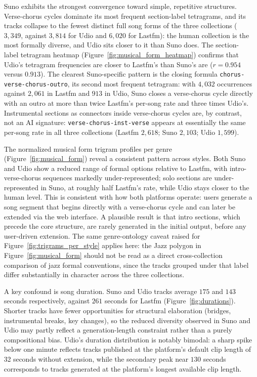 \documentclass{article}
\begin{document}
Suno exhibits the strongest convergence toward simple, repetitive structures. Verse-chorus cycles dominate its most frequent section-label tetragrams, and its tracks collapse to the fewest distinct full song forms of the three collections ($3{,}349$, against $3{,}814$ for Udio and $6{,}020$ for Lastfm): the human collection is the most formally diverse, and Udio sits closer to it than Suno does. The section-label tetragram heatmap (Figure~\ref{fig:musical_form_heatmap}) confirms that Udio's tetragram frequencies are closer to Lastfm's than Suno's are ($r = 0.954$ versus $0.913$). The clearest Suno-specific pattern is the closing formula \texttt{chorus-verse-chorus-outro}, its second most frequent tetragram: with $4,032$ occurrences against $2,061$ in Lastfm and $913$ in Udio, Suno closes a verse-chorus cycle directly with an outro at more than twice Lastfm's per-song rate and three times Udio's. Instrumental sections as connectors inside verse-chorus cycles are, by contrast, not an AI signature: \texttt{verse-chorus-inst-verse} appears at essentially the same per-song rate in all three collections (Lastfm $2,618$; Suno $2,103$; Udio $1,599$). 

The normalized musical form trigram profiles per genre (Figure~\ref{fig:musical_form}) reveal a consistent pattern across styles. Both Suno and Udio show a reduced range of formal options relative to Lastfm, with intro-verse-chorus sequences markedly under-represented; solo sections are under-represented in Suno, at roughly half Lastfm's rate, while Udio stays closer to the human level. This is consistent with how both platforms operate: users generate a song segment that begins directly with a verse-chorus cycle and can later be extended via the web interface. A plausible result is that intro sections, which precede the core structure, are rarely generated in the initial output, before any user-driven extension. The same genre-ontology caveat raised for Figure~\ref{fig:trigrams_per_style} applies here: the Jazz polygon in Figure~\ref{fig:musical_form} should not be read as a direct cross-collection comparison of jazz formal conventions, since the tracks grouped under that label differ substantially in character across the three collections.

A key confound is song duration.
Suno  and Udio tracks average $175$ and $143$ seconds respectively, against $261$ seconds for Lastfm (Figure~\ref{fig:durations}). 
Shorter tracks have fewer opportunities for structural elaboration (bridges, instrumental breaks, key changes), so the reduced diversity observed in Suno and Udio may partly reflect a generation-length constraint rather than a purely compositional bias. Udio's duration distribution is notably bimodal: a sharp spike below one minute reflects tracks published at the platform's default clip length of 32 seconds without extension, while the secondary peak near $130$ seconds corresponds to tracks generated at the platform's longest available clip length.
\end{document}
